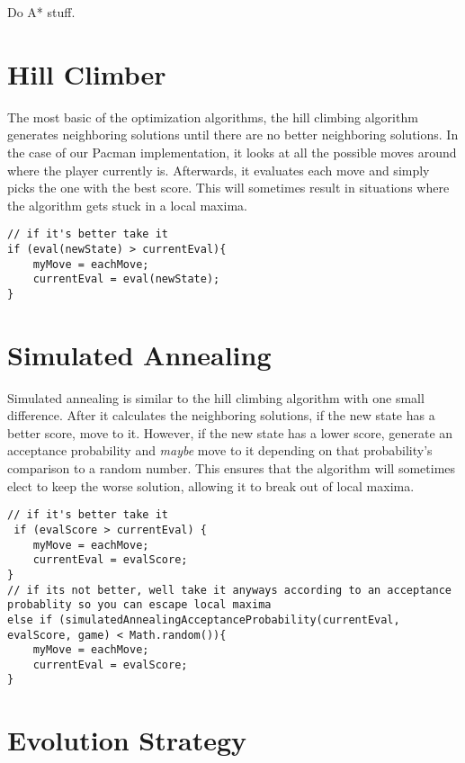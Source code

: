 \documentclass[a4paper,oneside,10pt]{report}
\begin{document}
Do A* stuff.

\section{Hill Climber}\label{hill}

The most basic of the optimization algorithms, the hill climbing algorithm generates neighboring solutions until there are no better neighboring solutions. In the case of our Pacman implementation, it looks at all the possible moves around where the player currently is. Afterwards, it evaluates each move and simply picks the one with the best score. This will sometimes result in situations where the algorithm gets stuck in a local maxima.

\begin{lstlisting}[caption=SNIPPETS: Hill Climber Decision Making]
// if it's better take it
if (eval(newState) > currentEval){
    myMove = eachMove;
    currentEval = eval(newState);
}
\end{lstlisting}

\section{Simulated Annealing}\label{sannealing}

Simulated annealing is similar to the hill climbing algorithm with one small difference. After it calculates the neighboring solutions, if the new state has a better score, move to it. However, if the new state has a lower score, generate an acceptance probability and \textit{maybe} move to it depending on that probability's comparison to a random number. This ensures that the algorithm will sometimes elect to keep the worse solution, allowing it to break out of local maxima.

\begin{lstlisting}[caption=SNIPPETS: Simulated Annealing Decision Making]
// if it's better take it
 if (evalScore > currentEval) {
    myMove = eachMove;
    currentEval = evalScore;
} 
// if its not better, well take it anyways according to an acceptance probablity so you can escape local maxima
else if (simulatedAnnealingAcceptanceProbability(currentEval, evalScore, game) < Math.random()){
    myMove = eachMove;
    currentEval = evalScore;
}
\end{lstlisting}

\section{Evolution Strategy}\label{evolution}
\end{document}
